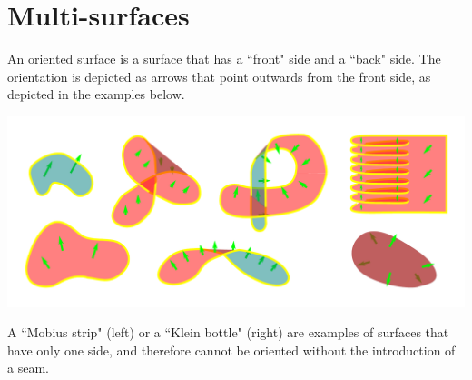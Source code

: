 \documentclass{book}
\begin{document}
\section{Multi-surfaces}

An oriented surface is a surface that has a ``front" side and a ``back" side. The orientation is depicted as arrows that point outwards from the front side, as depicted in the examples below.

\begin{center}
\includegraphics[scale = 0.7]{Multi-structures/Multisurfaces/oriented_surfaces}
\end{center}

A ``Mobius strip" (left) or a ``Klein bottle" (right) are examples of surfaces that have only one side, and therefore cannot be oriented without the introduction of a seam. 
\end{document}
